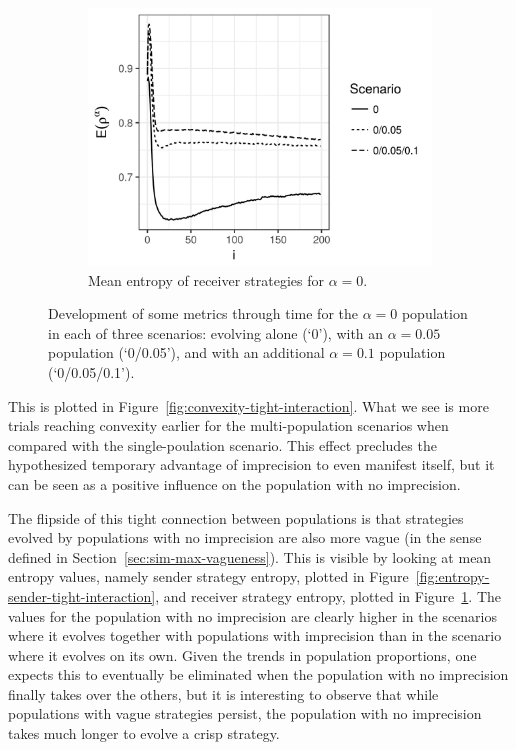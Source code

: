 \documentclass[a4paper]{article}
\begin{document}
\begin{figure}
  \hfill
  \begin{subfigure}[]{0.32\textwidth}
    \includegraphics[width=\textwidth]{simulation/results/round-3/plots/entropy-receiver-all-strong.png}
    \caption{Mean entropy of receiver strategies for $\alpha = 0$.}
    \label{fig:entropy-receiver-tight-interaction}
  \end{subfigure}
  \caption{Development of some metrics through time for the $\alpha = 0$ population in each of three scenarios: evolving alone (`0'), with an $\alpha = 0.05$ population (`0/0.05'), and with an additional $\alpha = 0.1$ population (`0/0.05/0.1').}
  \label{fig:metrics-tight-interaction}
\end{figure}
This is plotted in Figure~\ref{fig:convexity-tight-interaction}.
What we see is more trials reaching convexity earlier for the multi-population scenarios when compared with the single-poulation scenario.
This effect precludes the hypothesized temporary advantage of imprecision to even manifest itself, but it can be seen as a positive influence on the population with no imprecision.

The flipside of this tight connection between populations is that strategies evolved by populations with no imprecision are also more vague (in the sense defined in Section~\ref{sec:sim-max-vagueness}).
This is visible by looking at mean entropy values, namely sender strategy entropy, plotted in Figure~\ref{fig:entropy-sender-tight-interaction}, and receiver strategy entropy, plotted in Figure~\ref{fig:entropy-receiver-tight-interaction}.
The values for the population with no imprecision are clearly higher in the scenarios where it evolves together with populations with imprecision than in the scenario where it evolves on its own.
Given the trends in population proportions, one expects this to eventually be eliminated when the population with no imprecision finally takes over the others, but it is interesting to observe that while populations with vague strategies persist, the population with no imprecision takes much longer to evolve a crisp strategy.
\end{document}

